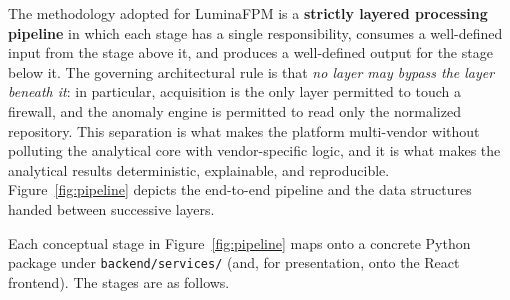 The methodology adopted for LuminaFPM is a \textbf{strictly layered processing pipeline} in which each stage has a single responsibility, consumes a well-defined input from the stage above it, and produces a well-defined output for the stage below it. The governing architectural rule is that \emph{no layer may bypass the layer beneath it}: in particular, acquisition is the only layer permitted to touch a firewall, and the anomaly engine is permitted to read only the normalized repository. This separation is what makes the platform multi-vendor without polluting the analytical core with vendor-specific logic, and it is what makes the analytical results deterministic, explainable, and reproducible. Figure~\ref{fig:pipeline} depicts the end-to-end pipeline and the data structures handed between successive layers.


Each conceptual stage in Figure~\ref{fig:pipeline} maps onto a concrete Python package under \texttt{backend/services/} (and, for presentation, onto the React frontend). The stages are as follows.

